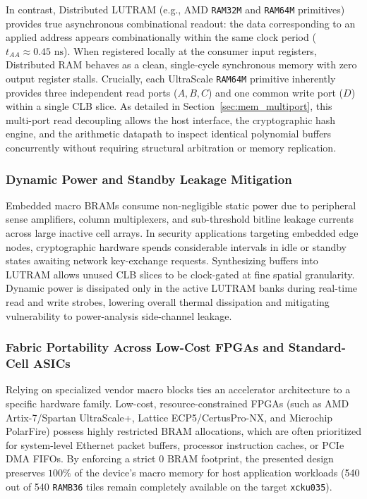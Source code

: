 In contrast, Distributed LUTRAM (e.g., AMD \texttt{RAM32M} and \texttt{RAM64M} primitives) provides true asynchronous combinational readout: the data corresponding to an applied address appears combinationally within the same clock period ($t_{AA} \approx 0.45\text{ ns}$). When registered locally at the consumer input registers, Distributed RAM behaves as a clean, single-cycle synchronous memory with zero output register stalls. Crucially, each UltraScale \texttt{RAM64M} primitive inherently provides three independent read ports ($A, B, C$) and one common write port ($D$) within a single CLB slice. As detailed in Section~\ref{sec:mem_multiport}, this multi-port read decoupling allows the host interface, the cryptographic hash engine, and the arithmetic datapath to inspect identical polynomial buffers concurrently without requiring structural arbitration or memory replication.

\subsubsection{Dynamic Power and Standby Leakage Mitigation}
Embedded macro BRAMs consume non-negligible static power due to peripheral sense amplifiers, column multiplexers, and sub-threshold bitline leakage currents across large inactive cell arrays. In security applications targeting embedded edge nodes, cryptographic hardware spends considerable intervals in idle or standby states awaiting network key-exchange requests. Synthesizing buffers into LUTRAM allows unused CLB slices to be clock-gated at fine spatial granularity. Dynamic power is dissipated only in the active LUTRAM banks during real-time read and write strobes, lowering overall thermal dissipation and mitigating vulnerability to power-analysis side-channel leakage.

\subsubsection{Fabric Portability Across Low-Cost FPGAs and Standard-Cell ASICs}
Relying on specialized vendor macro blocks ties an accelerator architecture to a specific hardware family. Low-cost, resource-constrained FPGAs (such as AMD Artix-7/Spartan UltraScale+, Lattice ECP5/CertusPro-NX, and Microchip PolarFire) possess highly restricted BRAM allocations, which are often prioritized for system-level Ethernet packet buffers, processor instruction caches, or PCIe DMA FIFOs. By enforcing a strict $0\text{ BRAM}$ footprint, the presented design preserves $100\%$ of the device's macro memory for host application workloads (540 out of 540 \texttt{RAMB36} tiles remain completely available on the target \texttt{xcku035}).

